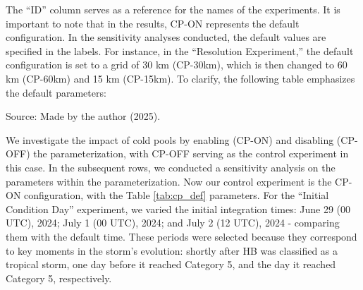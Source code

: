 The “ID” column serves as a reference for the names of the experiments. It is important to note that in the results, CP-ON represents the default configuration. In the sensitivity analyses conducted, the default values are specified in the labels. For instance, in the “Resolution Experiment,” the default configuration is set to a grid of 30 km (CP-30km), which is then changed to 60 km (CP-60km) and 15 km (CP-15km). To clarify, the following table emphasizes the default parameters:

\begin{table}[H]
	\centering
	\caption{Default values for the cold pool parameterization scheme}
	\label{tab:cp_def}
	\renewcommand{\arraystretch}{1.2}
	
	\vspace{2mm}
	{\centering Source: Made by the author (2025).\par}
\end{table}




We investigate the impact of cold pools by enabling (CP-ON) and disabling (CP-OFF) the parameterization, with CP-OFF serving as the control experiment in this case. In the subsequent rows, we conducted a sensitivity analysis on the parameters within the parameterization. Now our control experiment is the CP-ON configuration, with the Table \ref{tab:cp_def} parameters. For the “Initial Condition Day” experiment, we varied the initial integration times: June 29 (00 UTC), 2024; July 1 (00 UTC), 2024; and July 2 (12 UTC), 2024 - comparing them with the default time. These periods were selected because they correspond to key moments in the storm’s evolution: shortly after HB was classified as a tropical storm, one day before it reached Category 5, and the day it reached Category 5, respectively.

